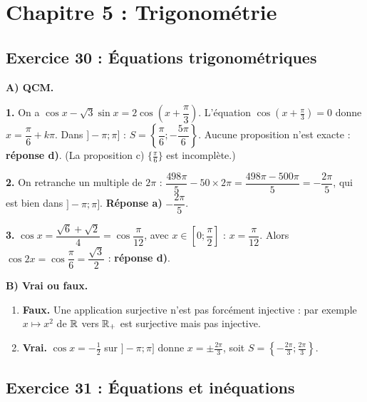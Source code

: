 \section{Chapitre 5 : Trigonom\'etrie}

\subsection{Exercice 30 : \'Equations trigonom\'etriques}

\textbf{A) QCM.}

\textbf{1.} On a $\cos x-\sqrt3\sin x=2\cos\left(x+\dfrac{\pi}{3}\right)$. L'\'equation $\cos\left(x+\frac{\pi}{3}\right)=0$ donne
$x=\dfrac{\pi}{6}+k\pi$. Dans $]-\pi;\pi]$ : $S=\left\{\dfrac{\pi}{6};-\dfrac{5\pi}{6}\right\}$.
Aucune proposition n'est exacte : \textbf{r\'eponse d)}. (La proposition c) $\{\frac{\pi}{6}\}$ est incompl\`ete.)

\textbf{2.} On retranche un multiple de $2\pi$ : $\dfrac{498\pi}{5}-50\times2\pi=\dfrac{498\pi-500\pi}{5}=-\dfrac{2\pi}{5}$, qui est bien dans $]-\pi;\pi]$.
\textbf{R\'eponse a)} $-\dfrac{2\pi}{5}$.

\textbf{3.} $\cos x=\dfrac{\sqrt6+\sqrt2}{4}=\cos\dfrac{\pi}{12}$, avec $x\in\left[0;\dfrac{\pi}{2}\right]$ : $x=\dfrac{\pi}{12}$.
Alors $\cos2x=\cos\dfrac{\pi}{6}=\dfrac{\sqrt3}{2}$ : \textbf{r\'eponse d)}.

\textbf{B) Vrai ou faux.}
\begin{enumerate}
  \item \textbf{Faux.} Une application surjective n'est pas forc\'ement injective : par exemple $x\mapsto x^2$ de $\mathbb{R}$ vers $\mathbb{R}_+$ est surjective mais pas injective.
  \item \textbf{Vrai.} $\cos x=-\frac12$ sur $]-\pi;\pi]$ donne $x=\pm\frac{2\pi}{3}$, soit $S=\left\{-\frac{2\pi}{3};\frac{2\pi}{3}\right\}$.
\end{enumerate}

\subsection{Exercice 31 : \'Equations et in\'equations}

